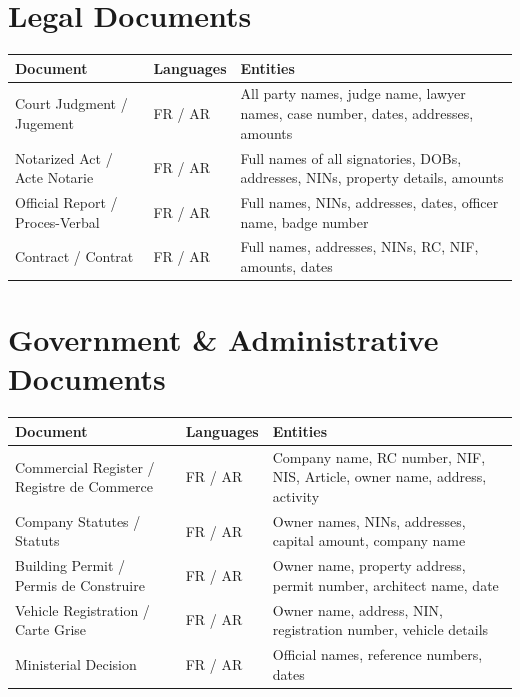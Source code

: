 \documentclass[11pt,a4paper]{article}
\begin{document}
\section{Legal Documents}

\begin{longtable}{|p{4.5cm}|p{2.5cm}|p{8.5cm}|}
\hline
\textbf{Document} & \textbf{Languages} & \textbf{Entities} \\
\hline
\endhead

Court Judgment / Jugement
&
FR / AR
&
All party names, judge name, lawyer names, case number, dates, addresses, amounts
\\ \hline

Notarized Act / Acte Notarie
&
FR / AR
&
Full names of all signatories, DOBs, addresses, NINs, property details, amounts
\\ \hline

Official Report / Proces-Verbal
&
FR / AR
&
Full names, NINs, addresses, dates, officer name, badge number
\\ \hline

Contract / Contrat
&
FR / AR
&
Full names, addresses, NINs, RC, NIF, amounts, dates
\\ \hline

\end{longtable}

\section{Government \& Administrative Documents}

\begin{longtable}{|p{5cm}|p{2.5cm}|p{8cm}|}
\hline
\textbf{Document} & \textbf{Languages} & \textbf{Entities} \\
\hline
\endhead

Commercial Register / Registre de Commerce
&
FR / AR
&
Company name, RC number, NIF, NIS, Article, owner name, address, activity
\\ \hline

Company Statutes / Statuts
&
FR / AR
&
Owner names, NINs, addresses, capital amount, company name
\\ \hline

Building Permit / Permis de Construire
&
FR / AR
&
Owner name, property address, permit number, architect name, date
\\ \hline

Vehicle Registration / Carte Grise
&
FR / AR
&
Owner name, address, NIN, registration number, vehicle details
\\ \hline

Ministerial Decision
&
FR / AR
&
Official names, reference numbers, dates
\\ \hline

\end{longtable}
\end{document}
